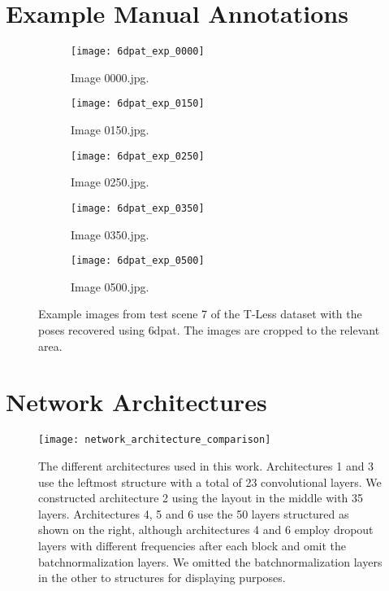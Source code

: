 \begin{appendices}

\chapter{Example Manual Annotations} \label{appendix:example_annotations}

\begin{figure}[!tbp]
	\centering
	\vspace{5mm}
	\begin{subfigure}[t]{0.47\textwidth}
		\centering
    	\texttt{[image: 6dpat\_exp\_0000]}
    	\caption{Image 0000.jpg.}
	\end{subfigure}
	\hfill
	\begin{subfigure}[t]{0.47\textwidth}
		\centering
    	\texttt{[image: 6dpat\_exp\_0150]}
    	\caption{Image 0150.jpg.}
	\end{subfigure}
	\par\bigskip
	\begin{subfigure}[t]{0.47\textwidth}
		\centering
    	\texttt{[image: 6dpat\_exp\_0250]}
    	\caption{Image 0250.jpg.}
	\end{subfigure}
	\hfill
	\begin{subfigure}[t]{0.47\textwidth}
		\centering
    	\texttt{[image: 6dpat\_exp\_0350]}
    	\caption{Image 0350.jpg.}
	\end{subfigure}
	\par\bigskip
	\begin{subfigure}[t]{0.47\textwidth}
		\centering
    	\texttt{[image: 6dpat\_exp\_0500]}
    	\caption{Image 0500.jpg.}
	\end{subfigure}
	\caption{Example images from test scene 7 of the T-Less dataset with the poses recovered using \ac{6dpat}. The images are cropped to the relevant area.}
\end{figure} 

\chapter{Network Architectures} \label{appendix:network_architectures}

\begin{figure}[!tbp]
	\centering
    \texttt{[image: network\_architecture\_comparison]}
    \caption{The different architectures used in this work. Architectures 1 and 3 use the leftmost structure with a total of 23 convolutional layers. We constructed architecture 2 using the layout in the middle with 35 layers. Architectures 4, 5 and 6 use the 50 layers structured as shown on the right, although architectures 4 and 6 employ dropout layers with different frequencies after each block and omit the batchnormalization layers. We omitted the batchnormalization layers in the other to structures for displaying purposes.}
    \label{fig:network_architecture_comparison}
\end{figure} 


\end{appendices}
